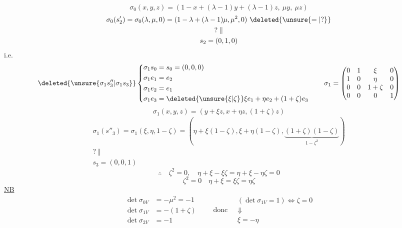 \[\boxed{\sigma_0(x,y,z)=(1-x+(\lambda-1)y+(\lambda-1)z,\ \mu y,\ \mu z)}\]
\[
\begin{gathered}
\sigma_0(s'_2)=\sigma_0(\lambda,\mu,0)=(1-\lambda+(\lambda-1)\mu,\mu^2,0)\ \deleted{\unsure{=|?}}\\
?\;\Vert\\s_2=(0,1,0)
\end{gathered}
\]
i.e.
\[
\deleted{\unsure{\sigma_1s''_3|\sigma_1s_3}}
\left\{\begin{aligned}
\sigma_1s_0&=s_0=(0,0,0)\\
\sigma_1e_1&=e_2\\
\sigma_1e_2&=e_1\\
\sigma_1e_3&=\deleted{\unsure{\xi|\zeta}}\xi e_1+\eta e_2+(1+\zeta)e_3
\end{aligned}\right.
\qquad
\sigma_1=\begin{pmatrix}
0&1&\xi&0\\1&0&\eta&0\\0&0&1+\zeta&0\\0&0&0&1
\end{pmatrix}
\]
\[\boxed{\sigma_1(x,y,z)=(y+\xi z,x+\eta z,(1+\zeta)z)}\]
\[
\begin{gathered}
\sigma_1(s''_3)=\sigma_1(\xi,\eta,1-\zeta)
=(\eta+\xi(1-\zeta),\xi+\eta(1-\zeta),\underbrace{(1+\zeta)(1-\zeta)}_{1-\zeta^2})\\
?\;\Vert\\s_3=(0,0,1)
\end{gathered}
\]
\[\therefore\quad\zeta^2=0,\quad\eta+\xi-\xi\zeta=\eta+\xi-\eta\zeta=0\]
\[\boxed{\zeta^2=0\quad\eta+\xi=\xi\zeta=\eta\zeta}\]
\uline{NB}
\[
\begin{aligned}
\det\sigma_{0V}&=-\mu^2=-1\\
\det\sigma_{1V}&=-(1+\zeta)\\
\det\sigma_{2V}&=-1
\end{aligned}
\qquad\text{donc}\quad
\begin{gathered}
\boxed{(\det\sigma_{1V}=1)\Longleftrightarrow\zeta=0}\\
\Downarrow\\\xi=-\eta
\end{gathered}
\]
